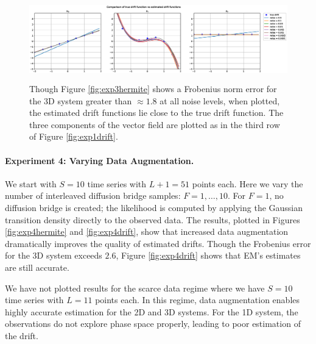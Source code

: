 \documentclass{article}
\begin{document}
\begin{figure}[th]
\begin{center}
\includegraphics[height=1.4in]{../3ddampedduffing/varying_noise/plots/drift_comparison.eps}
\end{center}
\caption{Though Figure \ref{fig:exp3hermite} shows a Frobenius norm error for the 3D system greater than $\approx 1.8$ at all noise levels, when plotted, the estimated drift functions lie close to the true drift function. The three components of the vector field are plotted as in the third row of Figure \ref{fig:exp1drift}.}
\label{fig:exp3drift}
\end{figure}

\vspace{-1.5ex}
\paragraph{Experiment 4: Varying Data Augmentation.}
We start with $S = 10$ time series with $L+1 = 51$ points each.  Here we vary the number of interleaved diffusion bridge samples: $F=1, \ldots, 10$.  For $F=1$, no diffusion bridge is created; the likelihood is computed by applying the Gaussian transition density directly to the observed data.  The results, plotted in Figures \ref{fig:exp4hermite} and \ref{fig:exp4drift}, show that increased data augmentation dramatically improves the quality of estimated drifts.  Though the Frobenius error for the 3D system exceeds $2.6$, Figure \ref{fig:exp4drift} shows that EM's estimates are still accurate.

We have not plotted results for the scarce data regime where we have $S=10$ time series with $L=11$ points each.  In this regime, data augmentation enables highly accurate estimation for the 2D and 3D systems.  For the 1D system, the observations do not explore phase space properly, leading to poor estimation of the drift.
\end{document}
